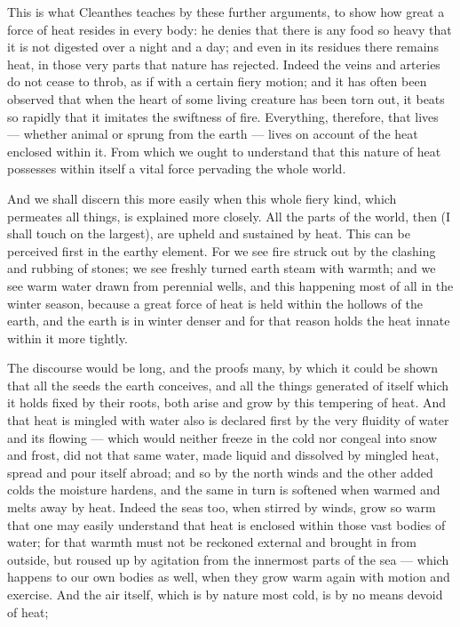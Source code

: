  This is what Cleanthes teaches by these further arguments, to show how great a force of heat resides in every body: he denies that there is any food so heavy that it is not digested over a night and a day; and even in its residues there remains heat, in those very parts that nature has rejected. Indeed the veins and arteries do not cease to throb, as if with a certain fiery motion; and it has often been observed that when the heart of some living creature has been torn out, it beats so rapidly that it imitates the swiftness of fire. Everything, therefore, that lives — whether animal or sprung from the earth — lives on account of the heat enclosed within it. From which we ought to understand that this nature of heat possesses within itself a vital force pervading the whole world.

 And we shall discern this more easily when this whole fiery kind, which permeates all things, is explained more closely. All the parts of the world, then (I shall touch on the largest), are upheld and sustained by heat. This can be perceived first in the earthy element. For we see fire struck out by the clashing and rubbing of stones; we see freshly turned earth steam with warmth; and we see warm water drawn from perennial wells, and this happening most of all in the winter season, because a great force of heat is held within the hollows of the earth, and the earth is in winter denser and for that reason holds the heat innate within it more tightly.

 The discourse would be long, and the proofs many, by which it could be shown that all the seeds the earth conceives, and all the things generated of itself which it holds fixed by their roots, both arise and grow by this tempering of heat. And that heat is mingled with water also is declared first by the very fluidity of water and its flowing — which would neither freeze in the cold nor congeal into snow and frost, did not that same water, made liquid and dissolved by mingled heat, spread and pour itself abroad; and so by the north winds and the other added colds the moisture hardens, and the same in turn is softened when warmed and melts away by heat. Indeed the seas too, when stirred by winds, grow so warm that one may easily understand that heat is enclosed within those vast bodies of water; for that warmth must not be reckoned external and brought in from outside, but roused up by agitation from the innermost parts of the sea — which happens to our own bodies as well, when they grow warm again with motion and exercise. And the air itself, which is by nature most cold, is by no means devoid of heat;

